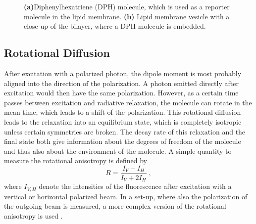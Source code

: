\documentclass{scrartcl}
\numberwithin{equation}{section}
\numberwithin{figure}{section}
\numberwithin{table}{section}
\newcommand{\eq}[2]{\begin{equation}#1\label{#2}\end{equation}}
\begin{document}
\begin{figure}
\centering
{}
\caption{ \small \textbf{(a)}Diphenylhexatriene (DPH) molecule, which is used as a reporter molecule in the lipid membrane. \textbf{(b)} Lipid membrane vesicle with a close-up of the bilayer, where a DPH molecule is embedded.}
\label{dph}
\end{figure}



\subsection{Rotational Diffusion}
After excitation with a polarized photon, the dipole moment is most probably aligned into the direction of the polarization. A photon emitted directly after excitation would then have the same polarization. However, as a certain time passes between excitation and radiative relaxation, the molecule can rotate in the mean time, which leads to a shift of the polarization. This rotational diffusion leads to the relaxation into an equilibrium state, which is completely isotropic unless certain symmetries are broken. The decay rate of this relaxation and the final state both give information about the degrees of freedom of the molecule and thus also about the environment of the molecule. A simple quantity to measure the rotational anisotropy is defined by
\eq{R=\frac{I_V -I_H}{I_V + 2I_H} \; ,}{R}
where $I_{V,H}$ denote the intensities of the fluorescence after excitation with a vertical or horizontal polarized beam. In a set-up, where also the polarization of the outgoing beam is measured, a more complex version of the rotational anisotropy is used \cite{lako}.
\end{document}
